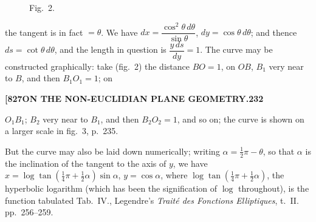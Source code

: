 \documentclass[12pt,a4paper]{article}
\theoremstyle{definition}
\begin{document}
\begin{figure}[H]
\centering
{}
\caption*{Fig.~2.}
\end{figure}

\noindent the tangent is in fact $= \theta$. We have $dx = \dfrac{\cos^2\theta\, d\theta}{\sin\theta}$, $dy = \cos\theta\, d\theta$; and thence $ds = \cot\theta\, d\theta$, and the length in question is $\dfrac{y\, ds}{dy} = 1$. The curve may be constructed graphically: take (fig.~2) the distance $BO = 1$, on $OB$, $B_1$ very near to $B$, and then $B_1O_1 = 1$; on

\newpage
\setcounter{page}{232}

\noindent\textbf{[827}\hfill\textbf{ON THE NON-EUCLIDIAN PLANE GEOMETRY.}\hfill\textbf{232}

\bigskip

\noindent $O_1B_1$; $B_2$ very near to $B_1$, and then $B_2O_2 = 1$, and so on; the curve is shown on a larger scale in fig.~3, p.~235.

But the curve may also be laid down numerically; writing $\alpha = \frac{1}{2}\pi - \theta$, so that $\alpha$ is the inclination of the tangent to the axis of $y$, we have $x = \log\tan(\frac{1}{4}\pi + \frac{1}{2}\alpha)\sin\alpha$, $y = \cos\alpha$, where $\log\tan(\frac{1}{4}\pi + \frac{1}{2}\alpha)$, the hyperbolic logarithm (which has been the signification of $\log$ throughout), is the function tabulated Tab.~IV., Legendre's \textit{Trait\'e des Fonctions Elliptiques}, t.~II. pp.~256--259.
\end{document}

